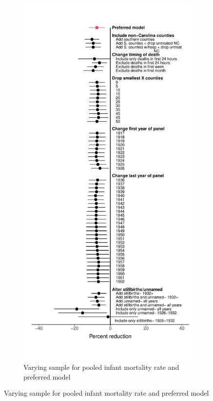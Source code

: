 \documentclass[12pt]{article}
\begin{document}
\begin{figure}[!ht]
\begin{subfigure}[t]{0.495\linewidth}
    \end{subfigure}
    \hfill
    \hspace*{-1cm}
    \begin{subfigure}[t]{0.495\linewidth}
      \caption{Varying sample for pooled infant mortality rate and preferred model\label{fig:appendix-visual-comparison}}
      \includegraphics[width=1.0\linewidth]{../analysis/output/main/figure_5b_sample_chart.pdf}

\end{subfigure}
\end{figure}
\end{document}
